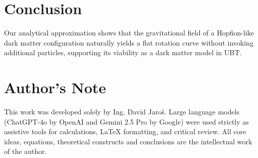 \documentclass[12pt]{article}
\begin{document}
\section*{Conclusion}

Our analytical approximation shows that the gravitational field of a Hopfion-like dark matter configuration naturally yields a flat rotation curve without invoking additional particles, supporting its viability as a dark matter model in UBT.


\section*{Author's Note}

This work was developed solely by Ing. David Jaroš.  
Large language models (ChatGPT-4o by OpenAI and Gemini 2.5 Pro by Google) were used strictly as assistive tools for calculations, LaTeX formatting, and critical review.  
All core ideas, equations, theoretical constructs and conclusions are the intellectual work of the author.
\end{document}
